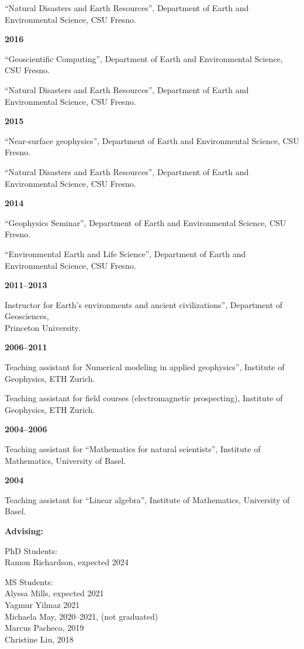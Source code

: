 \documentclass[10pt]{article}
\begin{document}
``Natural Disasters and Earth Resources'', Department of Earth and Environmental Science, CSU Fresno.

\spcp
\textbf{2016}

``Geoscientific Computing'', Department of Earth and Environmental Science, CSU Fresno.

``Natural Disasters and Earth Resources'', Department of Earth and Environmental Science, CSU Fresno.

\spcp
\textbf{2015}

``Near-surface geophysics'', Department of Earth and Environmental Science, CSU Fresno.

``Natural Disasters and Earth Resources'', Department of Earth and Environmental Science, CSU Fresno.

\spcp
\textbf{2014}

``Geophysics Seminar'', Department of Earth and Environmental Science, CSU Fresno.

``Environmental Earth and Life Science'', Department of Earth and Environmental Science, CSU Fresno.


\spcp
\textbf{2011--2013}

Instructor for Earth's environments and ancient civilizations'', Department of Geosciences,\\ Princeton University.

\clearpage
\textbf{2006--2011}

Teaching assistant for Numerical modeling in applied geophysics'',  Institute of Geophysics, ETH Zurich.
     
Teaching assistant for field courses (electromagnetic prospecting),
Institute of Geophysics, ETH Zurich.

\spcp
\textbf{2004--2006}

Teaching assistant for ``Mathematics for natural scientists'', Institute of Mathematics, University of Basel.

\spcp
\textbf{2004}

Teaching assistant for ``Linear algebra'', Institute of Mathematics, University of Basel.


\spc
\textbf{\tsize Advising:}

\spcp
PhD Students:\\
Ramon Richardson, expected 2024 

\spcp
MS Students:\\
Alyssa Mills, expected 2021 \\
Yagmur Yilmaz 2021 \\
Michaela May, 2020--2021, (not graduated) \\
Marcus Pacheco, 2019 \\
Christine Liu, 2018 
\end{document}
